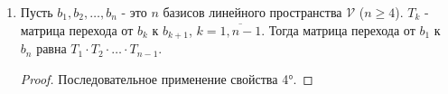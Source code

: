 \begin{enumerate}[label={\arabic*°.}]
\begin{proof}
        Согласно определению $\eqref{fig:definition_17_1}$ матрицы перехода, имеем равенства
        $$c = bT_{b \to c}, \quad d = cT_{c \to d},$$
        откуда
        $$d = cT_{c \to d} = (b T_{b \to c}) \cdot T_{c \to d} = b(T_{b \to c} \cdot T_{c \to d}),$$
        т.е. $T_{b \to c} \cdot T_{c \to d} = T_{b \to d}$ - матрица перехода от базиса $b$ к базису $d$.
    \end{proof}

    \item Пусть $b_1, b_2, \ldots, b_n$ - это $n$ базисов линейного пространства $\mathcal{V}$ ($n \geq 4$). $T_k$ - матрица перехода от $b_k$ к $b_{k + 1}$, $k = \overline{1, n - 1}$. Тогда матрица перехода от $b_1$ к $b_n$ равна $T_1\cdot T_2 \cdot \ldots \cdot T_{n - 1}$.
    \begin{proof}
        Последовательное применение свойства 4°.
    \end{proof}
\end{enumerate}
